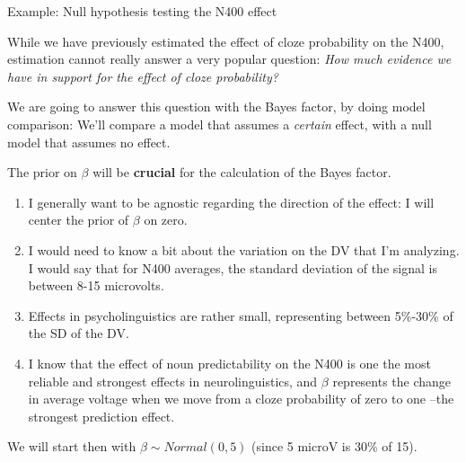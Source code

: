 \documentclass[12pt,ignorenonframetext,aspectratio=169]{beamer}
\providecommand{\tightlist}{%
  \setlength{\itemsep}{0pt}\setlength{\parskip}{0pt}}
\begin{document}
\begin{frame}{Example: Null hypothesis testing the N400 effect}
\protect\hypertarget{example-null-hypothesis-testing-the-n400-effect}{}

While we have previously estimated the effect of cloze probability on the N400, estimation cannot really answer a very popular question: \emph{How much evidence we have in support for the effect of cloze probability?}

\vspace{.3cm}

We are going to answer this question with the Bayes factor, by doing model comparison: We'll compare a model that assumes a \emph{certain} effect, with a null model that assumes no effect.

\end{frame}

\begin{frame}

The prior on \(\beta\) will be \textbf{crucial} for the calculation of the Bayes factor.

\small

\begin{enumerate}
\tightlist
\item
  I generally want to be agnostic regarding the direction of the effect: I will center the prior of \(\beta\) on zero.
\item
  I would need to know a bit about the variation on the DV that I'm analyzing. I would say that for N400 averages, the standard deviation of the signal is between 8-15 microvolts.
\item
  Effects in psycholinguistics are rather small, representing between 5\%-30\% of the SD of the DV.
\item
  I know that the effect of noun predictability on the N400 is one the most reliable and strongest effects in neurolinguistics, and \(\beta\) represents the change in average voltage when we move from a cloze probability of zero to one --the strongest prediction effect.
\end{enumerate}

We will start then with \(\beta \sim Normal(0,5)\) (since 5 microV is 30\% of 15).

\end{frame}
\end{document}
